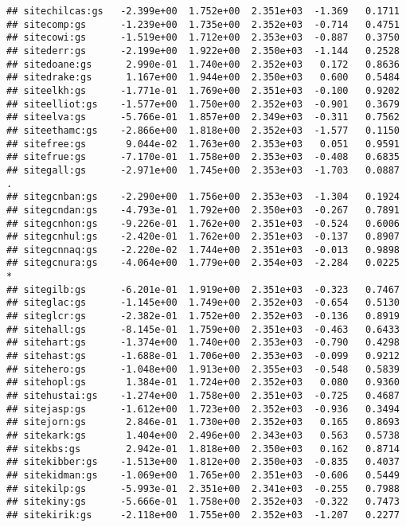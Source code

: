 \documentclass[
]{article}
\begin{document}
\begin{verbatim}
## sitechilcas:gs   -2.399e+00  1.752e+00  2.351e+03  -1.369   0.1711  
## sitecomp:gs      -1.239e+00  1.735e+00  2.352e+03  -0.714   0.4751  
## sitecowi:gs      -1.519e+00  1.712e+00  2.353e+03  -0.887   0.3750  
## sitederr:gs      -2.199e+00  1.922e+00  2.350e+03  -1.144   0.2528  
## sitedoane:gs      2.990e-01  1.740e+00  2.352e+03   0.172   0.8636  
## sitedrake:gs      1.167e+00  1.944e+00  2.350e+03   0.600   0.5484  
## siteelkh:gs      -1.771e-01  1.769e+00  2.351e+03  -0.100   0.9202  
## siteelliot:gs    -1.577e+00  1.750e+00  2.352e+03  -0.901   0.3679  
## siteelva:gs      -5.766e-01  1.857e+00  2.349e+03  -0.311   0.7562  
## siteethamc:gs    -2.866e+00  1.818e+00  2.352e+03  -1.577   0.1150  
## sitefree:gs       9.044e-02  1.763e+00  2.353e+03   0.051   0.9591  
## sitefrue:gs      -7.170e-01  1.758e+00  2.353e+03  -0.408   0.6835  
## sitegall:gs      -2.971e+00  1.745e+00  2.353e+03  -1.703   0.0887 .
## sitegcnban:gs    -2.290e+00  1.756e+00  2.353e+03  -1.304   0.1924  
## sitegcndan:gs    -4.793e-01  1.792e+00  2.350e+03  -0.267   0.7891  
## sitegcnhon:gs    -9.226e-01  1.762e+00  2.351e+03  -0.524   0.6006  
## sitegcnhul:gs    -2.420e-01  1.762e+00  2.351e+03  -0.137   0.8907  
## sitegcnnaq:gs    -2.220e-02  1.744e+00  2.351e+03  -0.013   0.9898  
## sitegcnura:gs    -4.064e+00  1.779e+00  2.354e+03  -2.284   0.0225 *
## sitegilb:gs      -6.201e-01  1.919e+00  2.351e+03  -0.323   0.7467  
## siteglac:gs      -1.145e+00  1.749e+00  2.352e+03  -0.654   0.5130  
## siteglcr:gs      -2.382e-01  1.752e+00  2.352e+03  -0.136   0.8919  
## sitehall:gs      -8.145e-01  1.759e+00  2.351e+03  -0.463   0.6433  
## sitehart:gs      -1.374e+00  1.740e+00  2.353e+03  -0.790   0.4298  
## sitehast:gs      -1.688e-01  1.706e+00  2.353e+03  -0.099   0.9212  
## sitehero:gs      -1.048e+00  1.913e+00  2.355e+03  -0.548   0.5839  
## sitehopl:gs       1.384e-01  1.724e+00  2.352e+03   0.080   0.9360  
## sitehustai:gs    -1.274e+00  1.758e+00  2.351e+03  -0.725   0.4687  
## sitejasp:gs      -1.612e+00  1.723e+00  2.352e+03  -0.936   0.3494  
## sitejorn:gs       2.846e-01  1.730e+00  2.352e+03   0.165   0.8693  
## sitekark:gs       1.404e+00  2.496e+00  2.343e+03   0.563   0.5738  
## sitekbs:gs        2.942e-01  1.818e+00  2.350e+03   0.162   0.8714  
## sitekibber:gs    -1.513e+00  1.812e+00  2.350e+03  -0.835   0.4037  
## sitekidman:gs    -1.069e+00  1.765e+00  2.351e+03  -0.606   0.5449  
## sitekilp:gs      -5.993e-01  2.351e+00  2.341e+03  -0.255   0.7988  
## sitekiny:gs      -5.666e-01  1.758e+00  2.352e+03  -0.322   0.7473  
## sitekirik:gs     -2.118e+00  1.755e+00  2.352e+03  -1.207   0.2277  

\end{verbatim}
\end{document}
